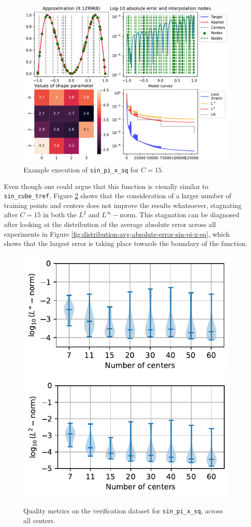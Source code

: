 \documentclass[12pt]{report} %
\begin{document}
\begin{figure}
  \includegraphics[width=\textwidth]{imagenes/experiments/1d/statistical_1d_full_scheduler_interpolation/sin_pi_x_sq/sin_pi_x_sq-TR60-C15-Kgaussian_kernel-Sh2.5-14-E129968.pdf}
  \caption{Example execution of \texttt{sin\_pi\_x\_sq} for $C=15$.}
  \label{fig:example-execution-sin-pi-x-sq}
\end{figure}

Even though one could argue that this function is visually similar to \texttt{sin\_cube\_tref}, Figure \ref{fig:violins-l-sin-pi-x-sq} shows that the consideration of a larger number of training points and centers does not improve the results whatsoever, stagnating after $C=15$ in both the $L^2$ and $L^\infty-$norm. This stagnation can be diagnosed after looking at the distribution of the average absolute error across all experiments in Figure \ref{fig:distribution-avg-absolute-error-sin-pi-x-sq}, which shows that the largest error is taking place towards the boundary of the function.

\begin{figure}
  \includegraphics[width=.45\textwidth]{imagenes/experiments/1d/statistical_1d_full_scheduler_interpolation/sin_pi_x_sq/violins_linf_sin_pi_x_sq_endgame_2.pdf}
  \includegraphics[width=.45\textwidth]{imagenes/experiments/1d/statistical_1d_full_scheduler_interpolation/sin_pi_x_sq/violins_l2_sin_pi_x_sq_endgame.pdf}
  \caption{Quality metrics on the verification dataset for \texttt{sin\_pi\_x\_sq}, across all centers.}
  \label{fig:violins-l-sin-pi-x-sq}
\end{figure}
\end{document}
